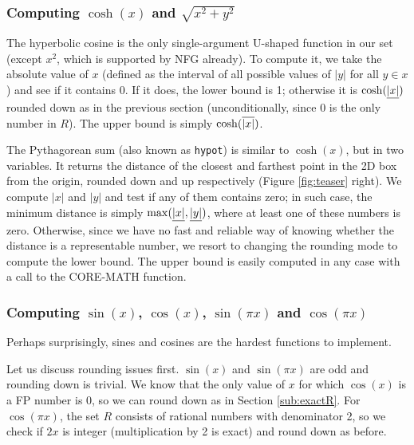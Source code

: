 \subsubsection{Computing $\cosh(x)$ and $\sqrt{x^2+y^2}$}
The hyperbolic cosine is the only single-argument U-shaped function in our set (except $x^2$, which is supported by NFG already). 
To compute it, we take the absolute value of $x$ (defined as the interval of all possible values of $|y|$ for all $y\in x$) and see if it contains 0. 
If it does, the lower bound is 1; otherwise it is $\cosh(\underline{|x|})$ rounded down as in the previous section (unconditionally, since 0 is the only number in $R$). The upper bound is simply $\cosh(\overline{|x|})$.

The Pythagorean sum (also known as \texttt{hypot}) is similar to $\cosh(x)$, but in two variables. It returns the distance of the closest and farthest point in the 2D box from the origin, rounded down and up respectively (Figure \ref{fig:teaser} right).
We compute $|x|$ and $|y|$ and test if any of them contains zero; in such case, the minimum distance is simply $\max(\underline{|x|}, \underline{|y|})$, where at least one of these numbers is zero.
Otherwise, since we have no fast and reliable way of knowing whether the distance is a representable number, we resort to changing the rounding mode to compute the lower bound.
The upper bound is easily computed in any case with a call to the CORE-MATH function.

\subsubsection{Computing $\sin(x)$, $\cos(x)$, $\sin(\pi x)$ and $\cos(\pi x)$}
\label{sub:sincos}
Perhaps surprisingly, sines and cosines are the hardest functions to implement.

Let us discuss rounding issues first. $\sin(x)$ and $\sin(\pi x)$ are odd and rounding down is trivial.
We know that the only value of $x$ for which $\cos(x)$ is a FP number is $0$, so we can round down as in Section \ref{sub:exactR}. 
For $\cos(\pi x)$, the set $R$ consists of rational numbers with denominator 2, so we check if $2x$ is integer (multiplication by 2 is exact) and round down as before.

